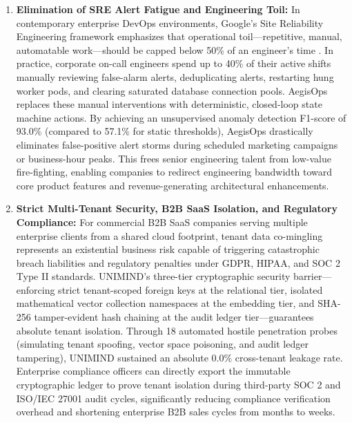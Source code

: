 \documentclass[12pt,onecolumn,draftclsnofoot]{IEEEtran}
\begin{document}
\begin{enumerate}
    \item \textbf{Elimination of SRE Alert Fatigue and Engineering Toil:}
    In contemporary enterprise DevOps environments, Google's Site Reliability Engineering framework emphasizes that operational toil---repetitive, manual, automatable work---should be capped below 50\% of an engineer's time \cite{beyer2016site}. In practice, corporate on-call engineers spend up to 40\% of their active shifts manually reviewing false-alarm alerts, deduplicating alerts, restarting hung worker pods, and clearing saturated database connection pools. AegisOps replaces these manual interventions with deterministic, closed-loop state machine actions. By achieving an unsupervised anomaly detection F1-score of 93.0\% (compared to 57.1\% for static thresholds), AegisOps drastically eliminates false-positive alert storms during scheduled marketing campaigns or business-hour peaks. This frees senior engineering talent from low-value fire-fighting, enabling companies to redirect engineering bandwidth toward core product features and revenue-generating architectural enhancements.

    \item \textbf{Strict Multi-Tenant Security, B2B SaaS Isolation, and Regulatory Compliance:}
    For commercial B2B SaaS companies serving multiple enterprise clients from a shared cloud footprint, tenant data co-mingling represents an existential business risk capable of triggering catastrophic breach liabilities and regulatory penalties under GDPR, HIPAA, and SOC 2 Type II standards. UNIMIND's three-tier cryptographic security barrier---enforcing strict tenant-scoped foreign keys at the relational tier, isolated mathematical vector collection namespaces at the embedding tier, and SHA-256 tamper-evident hash chaining at the audit ledger tier---guarantees absolute tenant isolation. Through 18 automated hostile penetration probes (simulating tenant spoofing, vector space poisoning, and audit ledger tampering), UNIMIND sustained an absolute 0.0\% cross-tenant leakage rate. Enterprise compliance officers can directly export the immutable cryptographic ledger to prove tenant isolation during third-party SOC 2 and ISO/IEC 27001 audit cycles, significantly reducing compliance verification overhead and shortening enterprise B2B sales cycles from months to weeks.


\end{enumerate}
\end{document}

